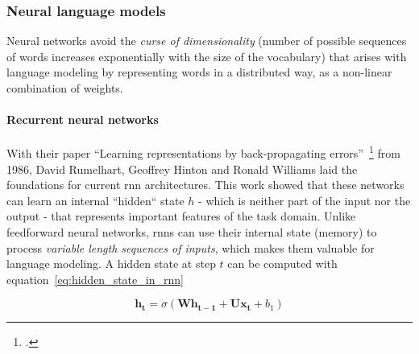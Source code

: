 \subsubsection{Neural language models}
\label{sub:neural_language_models}

Neural networks avoid the \textit{curse of dimensionality} (number of possible sequences of words increases exponentially with the size of the vocabulary) that arises with language modeling by representing words in a distributed way, as a non-linear combination of weights.

\paragraph{Recurrent neural networks}
With their paper “Learning representations by back-propagating errors”~\footcite{10.5555/65669.104451} from 1986, David Rumelhart, Geoffrey Hinton and Ronald Williams laid the foundations for current \gls{rnn} architectures. This work showed that these networks can learn an internal “hidden“ state $ h $ - which is neither part of the input nor the output - that represents important features of the task domain. Unlike feedforward neural networks, \gls{rnn}s can use their internal state (memory) to process \textit{variable length sequences of inputs}, which makes them valuable for language modeling. A hidden state at step $ t $ can be computed with equation~\ref{eq:hidden_state_in_rnn}

\begin{equation}
	\label{eq:hidden_state_in_rnn}
	\boldsymbol{h_t} = \sigma \left( \boldsymbol{W} \boldsymbol{h_{t-1}} + \boldsymbol{U} \boldsymbol{x_t} + b_1 \right)
\end{equation}

